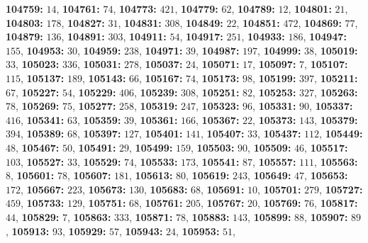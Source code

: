 \textsf{\bfseries 104759:} $14$, \textsf{\bfseries 104761:} $74$, \textsf{\bfseries 104773:} $421$, \textsf{\bfseries 104779:} $62$, \textsf{\bfseries 104789:} $12$, \textsf{\bfseries 104801:} $21$, \textsf{\bfseries 104803:} $178$, \textsf{\bfseries 104827:} $31$, \textsf{\bfseries 104831:} $308$, \textsf{\bfseries 104849:} $22$, \textsf{\bfseries 104851:} $472$, \textsf{\bfseries 104869:} $77$, \textsf{\bfseries 104879:} $136$, \textsf{\bfseries 104891:} $303$, \textsf{\bfseries 104911:} $54$, \textsf{\bfseries 104917:} $251$, \textsf{\bfseries 104933:} $186$, \textsf{\bfseries 104947:} $155$, \textsf{\bfseries 104953:} $30$, \textsf{\bfseries 104959:} $238$, \textsf{\bfseries 104971:} $39$, \textsf{\bfseries 104987:} $197$, \textsf{\bfseries 104999:} $38$, \textsf{\bfseries 105019:} $33$, \textsf{\bfseries 105023:} $336$, \textsf{\bfseries 105031:} $278$, \textsf{\bfseries 105037:} $24$, \textsf{\bfseries 105071:} $17$, \textsf{\bfseries 105097:} $7$, \textsf{\bfseries 105107:} $115$, \textsf{\bfseries 105137:} $189$, \textsf{\bfseries 105143:} $66$, \textsf{\bfseries 105167:} $74$, \textsf{\bfseries 105173:} $98$, \textsf{\bfseries 105199:} $397$, \textsf{\bfseries 105211:} $67$, \textsf{\bfseries 105227:} $54$, \textsf{\bfseries 105229:} $406$, \textsf{\bfseries 105239:} $308$, \textsf{\bfseries 105251:} $82$, \textsf{\bfseries 105253:} $327$, \textsf{\bfseries 105263:} $78$, \textsf{\bfseries 105269:} $75$, \textsf{\bfseries 105277:} $258$, \textsf{\bfseries 105319:} $247$, \textsf{\bfseries 105323:} $96$, \textsf{\bfseries 105331:} $90$, \textsf{\bfseries 105337:} $416$, \textsf{\bfseries 105341:} $63$, \textsf{\bfseries 105359:} $39$, \textsf{\bfseries 105361:} $166$, \textsf{\bfseries 105367:} $22$, \textsf{\bfseries 105373:} $143$, \textsf{\bfseries 105379:} $394$, \textsf{\bfseries 105389:} $68$, \textsf{\bfseries 105397:} $127$, \textsf{\bfseries 105401:} $141$, \textsf{\bfseries 105407:} $33$, \textsf{\bfseries 105437:} $112$, \textsf{\bfseries 105449:} $48$, \textsf{\bfseries 105467:} $50$, \textsf{\bfseries 105491:} $29$, \textsf{\bfseries 105499:} $159$, \textsf{\bfseries 105503:} $90$, \textsf{\bfseries 105509:} $46$, \textsf{\bfseries 105517:} $103$, \textsf{\bfseries 105527:} $33$, \textsf{\bfseries 105529:} $74$, \textsf{\bfseries 105533:} $173$, \textsf{\bfseries 105541:} $87$, \textsf{\bfseries 105557:} $111$, \textsf{\bfseries 105563:} $8$, \textsf{\bfseries 105601:} $78$, \textsf{\bfseries 105607:} $181$, \textsf{\bfseries 105613:} $80$, \textsf{\bfseries 105619:} $243$, \textsf{\bfseries 105649:} $47$, \textsf{\bfseries 105653:} $172$, \textsf{\bfseries 105667:} $223$, \textsf{\bfseries 105673:} $130$, \textsf{\bfseries 105683:} $68$, \textsf{\bfseries 105691:} $10$, \textsf{\bfseries 105701:} $279$, \textsf{\bfseries 105727:} $459$, \textsf{\bfseries 105733:} $129$, \textsf{\bfseries 105751:} $68$, \textsf{\bfseries 105761:} $205$, \textsf{\bfseries 105767:} $20$, \textsf{\bfseries 105769:} $76$, \textsf{\bfseries 105817:} $44$, \textsf{\bfseries 105829:} $7$, \textsf{\bfseries 105863:} $333$, \textsf{\bfseries 105871:} $78$, \textsf{\bfseries 105883:} $143$, \textsf{\bfseries 105899:} $88$, \textsf{\bfseries 105907:} $89$, \textsf{\bfseries 105913:} $93$, \textsf{\bfseries 105929:} $57$, \textsf{\bfseries 105943:} $24$, \textsf{\bfseries 105953:} $51$, 
